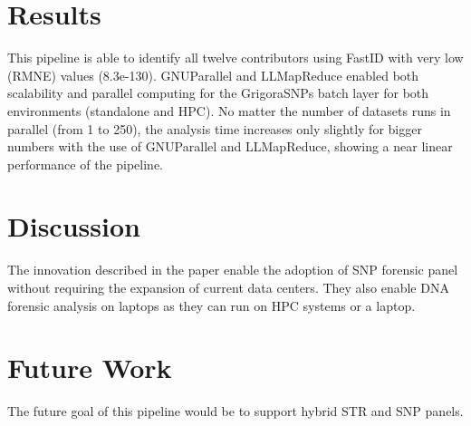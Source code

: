\documentclass[../main.tex]{subfiles}
\begin{document}
\section{Results}

This pipeline is able to identify all twelve contributors using FastID with very low (RMNE) values (8.3e-130). GNUParallel and LLMapReduce enabled both scalability and parallel computing for the GrigoraSNPs batch layer for both environments (standalone and HPC). No matter the number of datasets runs in parallel (from 1 to 250), the analysis time increases only slightly for bigger numbers with the use of GNUParallel and LLMapReduce, showing a near linear performance of the pipeline.

\section{Discussion}

The innovation described in the paper enable the adoption of SNP forensic panel without requiring the expansion of current data centers. They also enable DNA forensic analysis on laptops as they can run on HPC systems or a laptop.

\section{Future Work}

The future goal of this pipeline would be to support hybrid STR and SNP panels.
  
\end{document}
